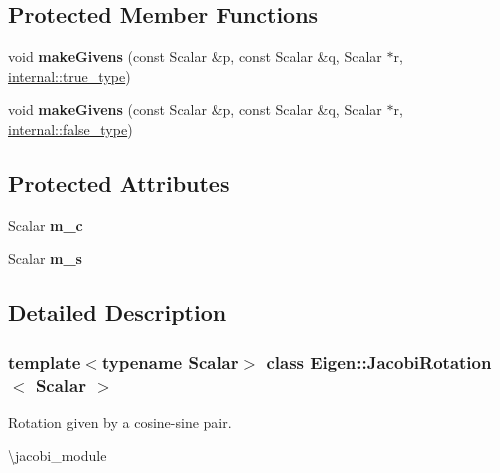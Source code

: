 \subsection*{Protected Member Functions}
\begin{DoxyCompactItemize}
\item 
\mbox{\label{class_eigen_1_1_jacobi_rotation_a68d2d68d714324f8218997f8e6aea165}} 
void {\bfseries make\+Givens} (const Scalar \&p, const Scalar \&q, Scalar $\ast$r, \mbox{\hyperlink{struct_eigen_1_1internal_1_1true__type}{internal\+::true\+\_\+type}})
\item 
\mbox{\label{class_eigen_1_1_jacobi_rotation_aeaee37ad16f5ffa10055fc0ac0d5591e}} 
void {\bfseries make\+Givens} (const Scalar \&p, const Scalar \&q, Scalar $\ast$r, \mbox{\hyperlink{struct_eigen_1_1internal_1_1false__type}{internal\+::false\+\_\+type}})
\end{DoxyCompactItemize}
\subsection*{Protected Attributes}
\begin{DoxyCompactItemize}
\item 
\mbox{\label{class_eigen_1_1_jacobi_rotation_a3dcad29a9dc19b6cedf827a206cb52a4}} 
Scalar {\bfseries m\+\_\+c}
\item 
\mbox{\label{class_eigen_1_1_jacobi_rotation_ad074a548f9c0a9e43b09a6e50164492a}} 
Scalar {\bfseries m\+\_\+s}
\end{DoxyCompactItemize}


\subsection{Detailed Description}
\subsubsection*{template$<$typename Scalar$>$\newline
class Eigen\+::\+Jacobi\+Rotation$<$ Scalar $>$}

Rotation given by a cosine-\/sine pair. 

\textbackslash{}jacobi\+\_\+module

